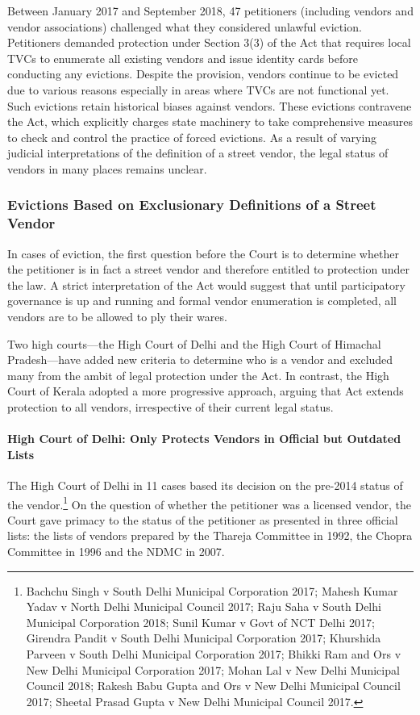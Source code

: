 \documentclass[a4paper, 12pt, twoside, table]{article}
\begin{document}
{Between January 2017 and September 2018, 47 petitioners (including vendors and vendor associations) challenged what they considered unlawful eviction. Petitioners demanded protection under Section 3(3) of the Act that requires local TVCs to enumerate all existing vendors and issue identity cards before conducting any evictions. Despite the provision, vendors continue to be evicted due to various reasons especially in areas where TVCs are not functional yet. Such evictions retain historical biases against vendors. These evictions contravene the Act, which explicitly charges state machinery to take comprehensive measures to check and control the practice of forced evictions. As a result of varying judicial interpretations of the definition of a street vendor, the legal status of vendors in many places remains unclear.

\subsubsection*{Evictions Based on Exclusionary Definitions of a Street Vendor}

In cases of eviction, the first question before the Court is to determine whether the petitioner is in fact a street vendor and therefore entitled to protection under the law. A strict interpretation of the Act would suggest that until participatory governance is up and running and formal vendor enumeration is completed, all vendors are to be allowed to ply their wares. 

Two high courts—the High Court of Delhi and the High Court of Himachal Pradesh—have added new criteria to determine who is a vendor and excluded many from the ambit of legal protection under the Act. In contrast, the High Court of Kerala adopted a more progressive approach, arguing that Act extends protection to all vendors, irrespective of their current legal status.

\paragraph*{High Court of Delhi: Only Protects Vendors in Official but Outdated Lists}

The High Court of Delhi in 11 cases based its decision on the pre-2014 status of the vendor.\footnote{ Bachchu Singh v South Delhi Municipal Corporation 2017; Mahesh Kumar Yadav v North Delhi Municipal Council 2017; Raju Saha v South Delhi Municipal Corporation 2018; Sunil Kumar v Govt of NCT Delhi 2017; Girendra Pandit v South Delhi Municipal Corporation 2017; Khurshida Parveen v South Delhi Municipal Corporation 2017; Bhikki Ram and Ors v New Delhi Municipal Corporation 2017; Mohan Lal v New Delhi Municipal Council 2018; Rakesh Babu Gupta and Ors v New Delhi Municipal Council 2017; Sheetal Prasad Gupta v New Delhi Municipal Council 2017.} On the question of whether the petitioner was a licensed vendor, the Court gave primacy to the status of the petitioner as presented in three official lists: the lists of vendors prepared by the Thareja Committee in 1992, the Chopra Committee in 1996 and the NDMC in 2007. 

}
\end{document}
